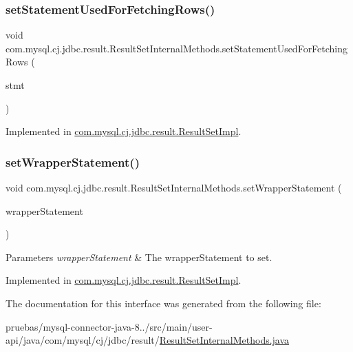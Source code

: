 \subsubsection{\texorpdfstring{set\+Statement\+Used\+For\+Fetching\+Rows()}{setStatementUsedForFetchingRows()}}
{\footnotesize\ttfamily void com.\+mysql.\+cj.\+jdbc.\+result.\+Result\+Set\+Internal\+Methods.\+set\+Statement\+Used\+For\+Fetching\+Rows (\begin{DoxyParamCaption}\item[{\mbox{\hyperlink{interfacecom_1_1mysql_1_1cj_1_1jdbc_1_1_jdbc_prepared_statement}{Jdbc\+Prepared\+Statement}}}]{stmt }\end{DoxyParamCaption})}



Implemented in \mbox{\hyperlink{classcom_1_1mysql_1_1cj_1_1jdbc_1_1result_1_1_result_set_impl_a170b3778d3020705fa199ef38b1722cc}{com.\+mysql.\+cj.\+jdbc.\+result.\+Result\+Set\+Impl}}.

\mbox{\label{interfacecom_1_1mysql_1_1cj_1_1jdbc_1_1result_1_1_result_set_internal_methods_aeaa719d2c55d3e0c32bd5b47b4020009}} 
\subsubsection{\texorpdfstring{set\+Wrapper\+Statement()}{setWrapperStatement()}}
{\footnotesize\ttfamily void com.\+mysql.\+cj.\+jdbc.\+result.\+Result\+Set\+Internal\+Methods.\+set\+Wrapper\+Statement (\begin{DoxyParamCaption}\item[{java.\+sql.\+Statement}]{wrapper\+Statement }\end{DoxyParamCaption})}


\begin{DoxyParams}{Parameters}
{\em wrapper\+Statement} & The wrapper\+Statement to set. \\
\hline
\end{DoxyParams}


Implemented in \mbox{\hyperlink{classcom_1_1mysql_1_1cj_1_1jdbc_1_1result_1_1_result_set_impl_a554db0f910df92f690ce667a5e5b5000}{com.\+mysql.\+cj.\+jdbc.\+result.\+Result\+Set\+Impl}}.



The documentation for this interface was generated from the following file\+:\begin{DoxyCompactItemize}
\item 
pruebas/mysql-\/connector-\/java-\/8../src/main/user-\/api/java/com/mysql/cj/jdbc/result/\mbox{\hyperlink{_result_set_internal_methods_8java}{Result\+Set\+Internal\+Methods.\+java}}\end{DoxyCompactItemize}
